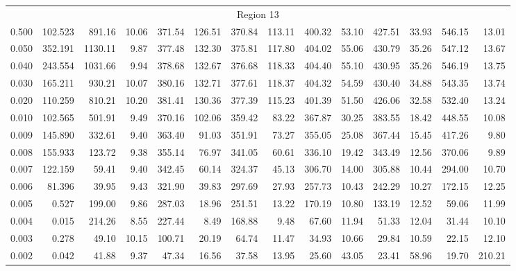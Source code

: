 \begin{tabular}{@{}lrrrrrrrrrrrrr@{}}
\midrule
\multicolumn{14}{c}{Region 13} \\
\cmidrule{1-14}
0.500 & 102.523 & 891.16 & 10.06 & 371.54 & 126.51 & 370.84 & 113.11 & 400.32 & 53.10 & 427.51 & 33.93 & 546.15 & 13.01 \\
0.050 & 352.191 & 1130.11 & 9.87 & 377.48 & 132.30 & 375.81 & 117.80 & 404.02 & 55.06 & 430.79 & 35.26 & 547.12 & 13.67 \\
0.040 & 243.554 & 1031.66 & 9.94 & 378.68 & 132.67 & 376.68 & 118.33 & 404.40 & 55.10 & 430.95 & 35.26 & 546.19 & 13.75 \\
0.030 & 165.211 & 930.21 & 10.07 & 380.16 & 132.71 & 377.61 & 118.37 & 404.32 & 54.59 & 430.40 & 34.88 & 543.35 & 13.74 \\
0.020 & 110.259 & 810.21 & 10.20 & 381.41 & 130.36 & 377.39 & 115.23 & 401.39 & 51.50 & 426.06 & 32.58 & 532.40 & 13.24 \\
0.010 & 102.565 & 501.91 & 9.49 & 370.16 & 102.06 & 359.42 & 83.22 & 367.87 & 30.25 & 383.55 & 18.42 & 448.55 & 10.08 \\
0.009 & 145.890 & 332.61 & 9.40 & 363.40 & 91.03 & 351.91 & 73.27 & 355.05 & 25.08 & 367.44 & 15.45 & 417.26 & 9.80 \\
0.008 & 155.933 & 123.72 & 9.38 & 355.14 & 76.97 & 341.05 & 60.61 & 336.10 & 19.42 & 343.49 & 12.56 & 370.06 & 9.89 \\
0.007 & 122.159 & 59.41 & 9.40 & 342.45 & 60.14 & 324.37 & 45.13 & 306.70 & 14.00 & 305.88 & 10.44 & 294.00 & 10.70 \\
0.006 & 81.396 & 39.95 & 9.43 & 321.90 & 39.83 & 297.69 & 27.93 & 257.73 & 10.43 & 242.29 & 10.27 & 172.15 & 12.25 \\
0.005 & 0.527 & 199.00 & 9.86 & 287.03 & 18.96 & 251.51 & 13.22 & 170.19 & 10.80 & 133.19 & 12.52 & 59.06 & 11.99 \\
0.004 & 0.015 & 214.26 & 8.55 & 227.44 & 8.49 & 168.88 & 9.48 & 67.60 & 11.94 & 51.33 & 12.04 & 31.44 & 10.10 \\
0.003 & 0.278 & 49.10 & 10.15 & 100.71 & 20.19 & 64.74 & 11.47 & 34.93 & 10.66 & 29.84 & 10.59 & 22.15 & 12.10 \\
0.002 & 0.042 & 41.88 & 9.37 & 47.34 & 16.56 & 37.58 & 13.95 & 25.60 & 43.05 & 23.41 & 58.96 & 19.70 & 210.21 \\

\bottomrule
\end{tabular}

